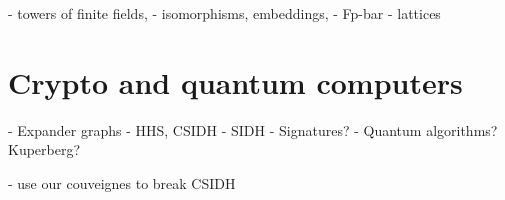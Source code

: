 \documentclass{report}
\theoremstyle{plain}
\theoremstyle{definition}
\begin{document}
- towers of finite fields,
- isomorphisms, embeddings,
- Fp-bar
- lattices


\chapter{Crypto and quantum computers}
\label{cha:crypto}

- Expander graphs
- HHS, CSIDH
- SIDH
- Signatures?
- Quantum algorithms? Kuperberg?

- use our couveignes to break CSIDH


\clearpage


\end{document}
